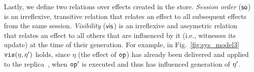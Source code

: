 Lastly, we define two relations over effects created in the store.
\emph{Session order} (${\textsf{so}}$) is an irreflexive, transitive relation
that relates an effect to all subsequent effects from the same
session.  \emph{Visibility} (${{\normalfont \textsf{vis}}}$) is an
irreflexive and assymetric relation that relates an effect to all
others that are influenced by it (i.e., witnesses its update) at the time of
their generation.  For example, in Fig.~\ref{fig:sys_model3} ${\normalfont \texttt{vis}}
(\eta,\eta')$ holds, since $\eta$ (the effect of ${\normalfont \texttt{op}}$) has already
been delivered and applied to the replica~, when ${\normalfont \texttt{op}}'$ is
executed and thus has influenced generation of $\eta'$.















































































